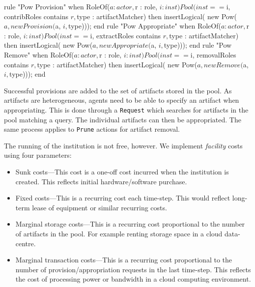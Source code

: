 \begin{drools}[label=lst:provapppow,caption={[Institutionalised power for provision, appropration and removal from a pool of artifacts.]Institutionalised power for provision, appropration and removal from a pool of artifacts. The \texttt{artifactMatcher} specifies which type of object can be provisioned to the pool.}]
rule "Pow Provision"
	when
		RoleOf($a : actor, $r : role, $i : inst)
		Pool(inst == $i, contribRoles contains $r, $type : artifactMatcher)
	then
		insertLogical( new Pow($a, new Provision($a, $i, $type)));
end
rule "Pow Appropriate"
	when
		RoleOf($a : actor, $r : role, $i : inst)
		Pool(inst == $i, extractRoles contains $r, $type : artifactMatcher)
	then
		insertLogical( new Pow($a, new Appropriate($a, $i, $type)));
end
rule "Pow Remove"
	when
		RoleOf($a : actor, $r : role, $i : inst)
		Pool(inst == $i, removalRoles contains $r, $type : artifactMatcher)
	then
		insertLogical( new Pow($a, new Remove($a, $i, $type)));
end
\end{drools}

Successful provisions are added to the set of artifacts stored in the pool. As
artifacts are heterogeneous, agents need to be able to specify an artifact when
appropriating. This is done through a \texttt{Request} which searches for
artifacts in the pool matching a query. The individual artifacts can then be
appropriated. The same process applies to \texttt{Prune} actions for artifact
removal.

The running of the institution is not free, however. We implement
\emph{facility} costs using four parameters:

\begin{itemize}
\item Sunk costs---This cost is a one-off cost incurred when the institution is created. This reflects initial hardware/software purchase.
\item Fixed costs---This is a recurring cost each time-step. This would reflect long-term lease of equipment or similar recurring costs.
\item Marginal storage costs---This is a recurring cost proportional to the number of artifacts in the pool. For example renting storage space in a cloud data-centre.
\item Marginal transaction costs---This is a recurring cost proportional to the number of provision/appropriation requests in the last time-step. This reflects the cost of processing power or bandwidth in a cloud computing environment.
\end{itemize}

